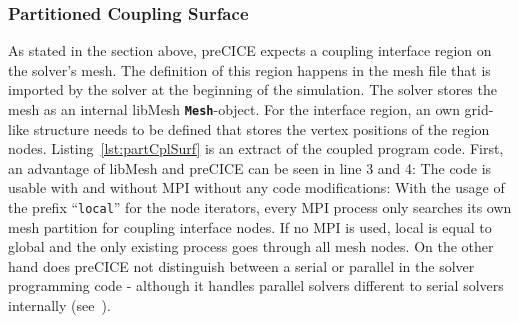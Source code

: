   \subsubsection{Partitioned Coupling Surface}\label{sec:Coupl-Impl-PartCplSurf}
   As stated in the section above, preCICE expects a coupling interface region on the solver's mesh. The definition of this region happens in the mesh file that is imported by the solver at the beginning of the simulation. The solver stores the mesh as an internal libMesh \texttt{\textbf{Mesh}}-object. For the interface region, an own grid-like structure needs to be defined that stores the vertex positions of the region nodes. Listing~\ref{lst:partCplSurf} is an extract of the coupled program code. First, an advantage of libMesh and preCICE can be seen in line 3 and 4: The code is usable with and without MPI without any code modifications: With the usage of the prefix ``\texttt{local}'' for the node iterators, every MPI process only searches its own mesh partition for coupling interface nodes. If no MPI is used, local is equal to global and the only existing process goes through all mesh nodes. On the other hand does preCICE not distinguish between a serial or parallel in the solver programming code - although it handles parallel solvers different to serial solvers internally (see~\cite{gatzhammer2015efficient}).
   
